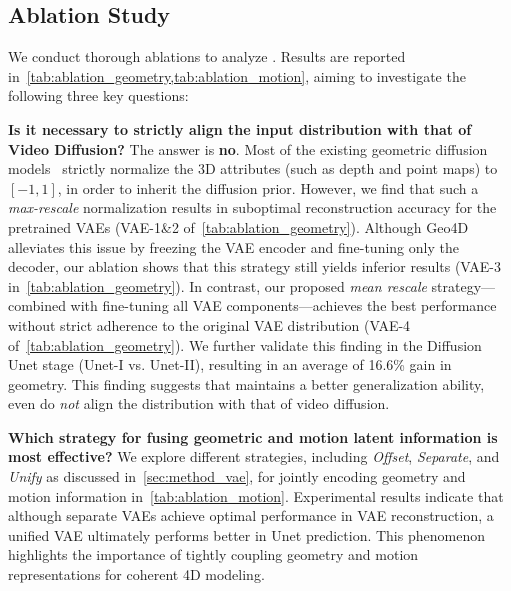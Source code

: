 


\subsection{Ablation Study}
We conduct thorough ablations to analyze \method.
Results are reported in~\cref{tab:ablation_geometry,tab:ablation_motion},
aiming to investigate the following three key questions:



\noindent
\textbf{Is it necessary to strictly align the input distribution with that of Video Diffusion?}
The answer is \textbf{no}.
Most of the existing geometric diffusion models~\cite{ke2024repurposing,zhang2024world,jiang2025geo4d}
strictly normalize the 3D attributes (such as depth and point maps) to $[-1, 1]$,
in order to inherit the diffusion prior.
However,
we find that such a \textit{max-rescale} normalization results in suboptimal reconstruction accuracy for the pretrained VAEs (VAE-1\&2 of~\cref{tab:ablation_geometry}). 
Although Geo4D~\cite{jiang2025geo4d} alleviates this issue by freezing the VAE encoder and fine-tuning only the decoder, 
our ablation shows that this strategy still yields inferior results (VAE-3 in~\cref{tab:ablation_geometry}).
In contrast,
our proposed \emph{mean rescale} strategy---combined with fine-tuning all VAE components---achieves the best performance without strict adherence to the original VAE distribution (VAE-4 of~\cref{tab:ablation_geometry}). 
We further validate this finding in the Diffusion Unet stage (Unet-I vs. Unet-II),
resulting in an average of 16.6\% gain in geometry.
This finding suggests that \method maintains a better generalization ability,
even do \emph{not} align the distribution with that of video diffusion.




\noindent
\textbf{Which strategy for fusing geometric and motion latent information is most effective?}
We explore different strategies,
including \emph{Offset}, \emph{Separate}, and \emph{Unify} as discussed in~\cref{sec:method_vae},
for jointly encoding geometry and motion information in~\cref{tab:ablation_motion}.
Experimental results indicate that although separate VAEs achieve optimal performance in VAE reconstruction, a unified VAE ultimately performs better in Unet prediction.
This phenomenon highlights the importance of tightly coupling geometry and motion representations for coherent 4D modeling.

